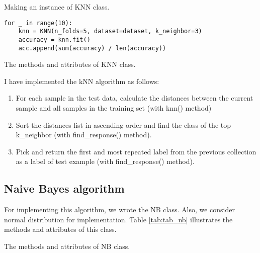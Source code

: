 \begin{table}[H]
\centering
\caption{Making an instance of KNN class.}
\begin{lstlisting}
for _ in range(10):
    knn = KNN(n_folds=5, dataset=dataset, k_neighbor=3)
    accuracy = knn.fit()
    acc.append(sum(accuracy) / len(accuracy))
\end{lstlisting}
\end{table}




\begin{table}[H]
\centering
\caption{The methods and attributes of KNN class.}
\label{tab:tab_knn}

\end{table}

I have implemented the kNN algorithm as follows:

\begin{enumerate}
    \item For each sample in the test data, calculate the distances between the current sample and all samples in the training set (with knn() method)
    \item Sort the distances list in ascending order and find the class of the top k\_neighbor (with find\_response() method).
    \item Pick and return the first and most repeated label from the previous collection as a label of test example (with find\_response() method).
    
\end{enumerate}













\subsection{Naive Bayes algorithm}

For implementing this algorithm, we wrote the NB class. Also, we consider normal distribution for implementation. Table \ref{tab:tab_nb} illustrates the methods and attributes of this class.

\begin{table}[H]
\centering
\caption{The methods and attributes of NB class.}
\label{tab:tab_nb}

\end{table}

